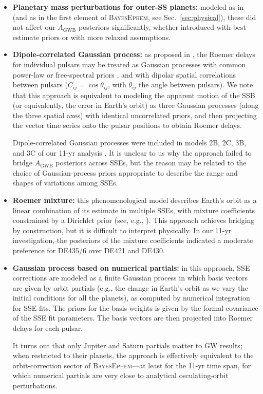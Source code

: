 \documentclass[iop,apj,twocolappendix]{emulateapj}
\begin{document}
\begin{itemize} %
    \item \textbf{Planetary mass perturbations for outer-SS planets:} modeled as in \cite{2010ApJ...720L.201C} (and as in the first element of \textsc{BayesEphem}, see Sec.\ \ref{sec:physical}), these did not affect our $A_\mathrm{GWB}$ posteriors significantly, whether introduced with best-estimate priors \citep{iaumasses} or with more relaxed assumptions.
    \item \textbf{Dipole-correlated Gaussian process:}
    as proposed in \cite{2016MNRAS.455.4339T}, the Roemer delays for individual pulsars may be treated as Gaussian processes with common power-law or free-spectral priors \citep{vhv14}, and with dipolar spatial correlations between pulsars ($C_{ij} = \cos \theta_{ij}$, with $\theta_{ij}$ the angle between pulsars).
    We note that this approach is equivalent to modeling the apparent motion of the SSB (or equivalently, the error in Earth's orbit) as three Gaussian processes (along the three spatial axes) with identical uncorrelated priors, and then projecting the vector time series onto the pulsar positions to obtain Roemer delays.
    
    Dipole-correlated Gaussian processes were included in models 2B, 2C, 3B, and 3C of our 11-yr analysis \citep{2018ApJ...859...47A}.
    It is unclear to us why the approach failed to bridge $A_\mathrm{GWB}$ posteriors across SSEs, but the reason may be related to the choice of Gaussian-process priors appropriate to describe the range and shapes of variations among SSEs.
    \item \textbf{Roemer mixture:} this phenomenological model describes Earth's orbit as a linear combination of its estimate in multiple SSEs, with mixture coefficients constrained by a Dirichlet prior (see, e.g., \citealt{gelman2013bayesian}). 
    This approach achieves bridging by construction, but it is difficult to interpret physically.
    In our 11-yr investigation, the posteriors of the mixture coefficients indicated a moderate preference for DE435/6 over DE421 and DE430.
    \item \textbf{Gaussian process based on numerical partials:} in this approach, SSE corrections are modeled as a finite Gaussian process \citep{williams2006gaussian} in which basis vectors are given by orbit partials (e.g., the change in Earth's orbit as we vary the initial conditions for all the planets), as computed by numerical integration for SSE fits. The priors for the basis weights is given by the formal covariance of the SSE fit parameters. The basis vectors are then projected into Roemer delays for each pulsar.
    
    It turns out that only Jupiter and Saturn partials matter to GW results; when restricted to their planets, the approach is effectively equivalent to the orbit-correction sector of \textsc{BayesEphem}---at least for the 11-yr time span, for which numerical partials are very close to analytical osculating-orbit perturbations.
\end{itemize}
\end{document}
